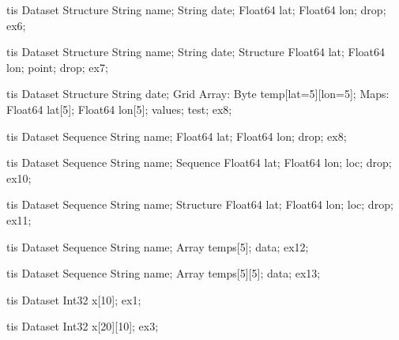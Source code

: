 \documentclass[justify]{dods-paper}
\begin{document}
\begin{vcode}{tis}
Dataset {
  Structure {
    String name;
    String date;
    Float64 lat;
    Float64 lon;
  } drop;
} ex6;
\end{vcode}

\begin{vcode}{tis}
Dataset {
  Structure {
    String name;
    String date;
    Structure {
      Float64 lat;
      Float64 lon;
    } point;
  } drop;
} ex7;
\end{vcode}

\begin{vcode}{tis}
Dataset {
  Structure {
    String date;
    Grid {
      Array: 
      Byte temp[lat=5][lon=5];
      Maps:
      Float64 lat[5];
      Float64 lon[5];
    } values;
  } test;
} ex8;
\end{vcode}

\begin{vcode}{tis}
Dataset {
  Sequence {
    String name;
    Float64 lat;
    Float64 lon;
  } drop;
} ex8;
\end{vcode}

\begin{vcode}{tis}
Dataset {
  Sequence {
    String name;
    Sequence {
      Float64 lat;
      Float64 lon;
    } loc;
  } drop;
} ex10;
\end{vcode}

\begin{vcode}{tis}
Dataset {
  Sequence {
    String name;
    Structure {
      Float64 lat;
      Float64 lon;
    } loc;
  } drop;
} ex11;
\end{vcode}

\begin{vcode}{tis}
Dataset {
  Sequence {
    String name;
    Array temps[5];
  } data;
} ex12;
\end{vcode}

\begin{vcode}{tis}
Dataset {
  Sequence {
    String name;
    Array temps[5][5];
  } data;
}ex13;
\end{vcode}

\begin{vcode}{tis}
Dataset {
    Int32 x[10];
} ex1;
\end{vcode}

\begin{vcode}{tis}
Dataset {
    Int32 x[20][10];
} ex3;
\end{vcode}
\end{document}
